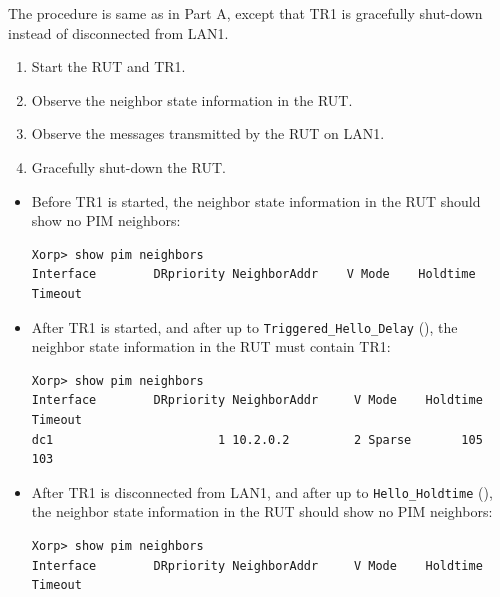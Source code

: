 \documentclass[11pt]{report}
\begin{document}

The procedure is same as in Part A, except that TR1 is gracefully shut-down
instead of disconnected from LAN1.


\begin{enumerate}

  \item Start the RUT and TR1.

  \item Observe the neighbor state information in the RUT.

  \item Observe the messages transmitted by the RUT on LAN1.

  \item Gracefully shut-down the RUT.

\end{enumerate}



\begin{itemize}

  \item Before TR1 is started, the neighbor state information in the RUT should
        show no PIM neighbors:

\begin{verbatim}
Xorp> show pim neighbors 
Interface        DRpriority NeighborAddr    V Mode    Holdtime Timeout
\end{verbatim}

  \item After TR1 is started, and after up to \verb=Triggered_Hello_Delay=
        ({\PimsmTriggeredHelloDelay}), the neighbor state information in the
        RUT must contain TR1:

\begin{verbatim}
Xorp> show pim neighbors 
Interface        DRpriority NeighborAddr     V Mode    Holdtime Timeout
dc1                       1 10.2.0.2         2 Sparse       105     103
\end{verbatim}

  \item After TR1 is disconnected from LAN1, and after up to
        \verb=Hello_Holdtime= ({\PimsmHelloHoldtime}), the neighbor state
        information in the RUT should show no PIM neighbors:

\begin{verbatim}
Xorp> show pim neighbors 
Interface        DRpriority NeighborAddr     V Mode    Holdtime Timeout
\end{verbatim}

\end{itemize}
\end{document}
